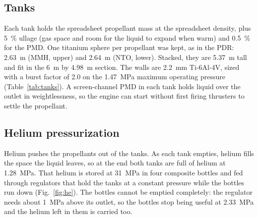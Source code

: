 \documentclass[10pt]{article}
\newcommand{\Npu}{1.28}
\newcommand{\NMEOP}{1.47}
\newcommand{\Npend}{2.33}
\newcommand{\Nstack}{5.37}
\newcommand{\NDtank}{2.64}
\newcommand{\NDtankf}{2.63}
\newcommand{\Nttank}{2.2}
\begin{document}
\subsection{Tanks}\label{sec:tanks}
Each tank holds the spreadsheet propellant mass at the spreadsheet density, plus 5~\% ullage (gas space and room for
the liquid to expand when warm) and 0.5~\% for the PMD. One titanium sphere per propellant was kept, as in the PDR:
\NDtankf~m (MMH, upper) and \NDtank~m (NTO, lower). Stacked, they are \Nstack~m tall and fit in the 6~m by 4.98~m
section. The walls are \Nttank~mm Ti-6Al-4V, sized with a burst factor of 2.0 on the \NMEOP~MPa maximum operating
pressure (Table~\ref{tab:tanks}). A screen-channel PMD in each tank holds liquid over the outlet in weightlessness, so
the engine can start without first firing thrusters to settle the propellant.
\begin{table}[H]\centering\small\caption{Propellant tanks.}\label{tab:tanks}\end{table}

\subsection{Helium pressurization}
Helium pushes the propellants out of the tanks. As each tank empties, helium fills the space the liquid leaves, so at the
end both tanks are full of helium at \Npu~MPa. That helium is stored at 31~MPa in four composite bottles and fed through
regulators that hold the tanks at a constant pressure while the bottles run down (Fig.~\ref{fig:he}). The bottles cannot be
emptied completely: the regulator needs about 1~MPa above its outlet, so the bottles stop being useful at \Npend~MPa
and the helium left in them is carried too.
\end{document}
